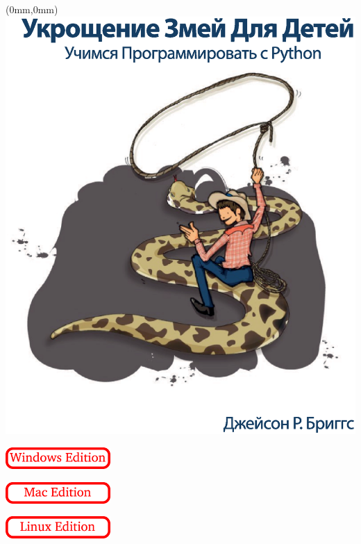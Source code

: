 \pagestyle{empty}
\frontmatter
\begin{FRONTCOVER}
\begin{titlepage}
\begin{textblock*}{210mm}(0mm,0mm)
   \includegraphics[width=0.9\paperwidth]{cover-ru.eps}
\end{textblock*}
\begin{flushright}
\begin{WINDOWS}
\includegraphics[width=40mm]{windows-edition.eps} 
\end{WINDOWS}
\begin{MAC}
\includegraphics[width=40mm]{mac-edition.eps} 
\end{MAC}
\begin{LINUX}
\includegraphics[width=40mm]{linux-edition.eps} 
\end{LINUX}
\end{flushright}
\end{titlepage}
\end{FRONTCOVER}

